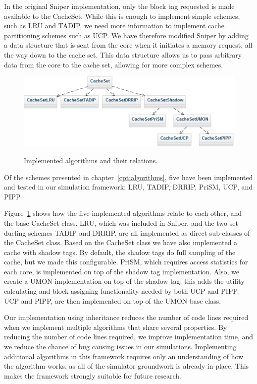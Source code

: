 In the original Sniper implementation, only the block tag requested is made available to the CacheSet. 
While this is enough to implement simple schemes, such as LRU and TADIP, we need more information to implement cache partitioning schemes such as UCP.
We have therefore modified Sniper by adding a data structure that is sent from the core when it initiates a memory request, all the way down to the cache set.
This data structure allows us to pass arbitrary data from the core to the cache set, allowing for more complex schemes.

\begin{figure}[ht]
\centering
\includegraphics[scale=0.7]{figures/framework/algorithms}
\label{fig:framework:implementation:algorithms}
\caption{Implemented algorithms and their relations.}
\end{figure}

Of the schemes presented in chapter~\ref{cpt:algorithms}, five have been implemented and tested in our simulation framework; LRU, TADIP, DRRIP, PriSM, UCP, and PIPP.

Figure~\ref{fig:framework:implementation:algorithms} shows how the five implemented algorithms relate to each other, and the base CacheSet class.
LRU, which was included in Sniper, and the two set dueling schemes TADIP and DRRIP, are all implemented as direct sub-classes of the CacheSet class.
Based on the CacheSet class we have also implemented a cache with shadow tags.
By default, the shadow tags do full sampling of the cache, but we made this configurable.
PriSM, which requires access statistics for each core, is implemented on top of the shadow tag implementation.
Also, we create a UMON implementation on top of the shadow tag; this adds the utility calculating and block assigning functionality needed by both UCP and PIPP.
UCP and PIPP, are then implemented on top of the UMON base class.

Our implementation using inheritance reduces the number of code lines required when we implement multiple algorithms that share several properties.
By reducing the number of code lines required, we improve implementation time, and we reduce the chance of bug causing issues in our simulations.
Implementing additional algorithms in this framework requires only an understanding of how the algorithm works, as all of the simulator groundwork is already in place.
This makes the framework strongly suitable for future research.

